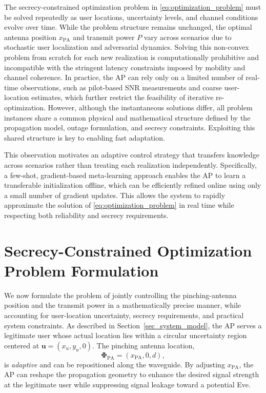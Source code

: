 \documentclass[journal,10pt]{IEEEtran}
\begin{document}
The secrecy-constrained optimization problem in \eqref{eq:optimization_problem} must be solved repeatedly as user locations, uncertainty levels, and channel conditions evolve over time. While the problem structure remains unchanged, the optimal antenna position $x_{\mathrm{PA}}$ and transmit power $P$ vary across scenarios due to stochastic user localization and adversarial dynamics. Solving this non-convex problem from scratch for each new realization is computationally prohibitive and incompatible with the stringent latency constraints imposed by mobility and channel coherence. In practice, the AP can rely only on a limited number of real-time observations, such as pilot-based SNR measurements and coarse user-location estimates, which further restrict the feasibility of iterative re-optimization. However, although the instantaneous solutions differ, all problem instances share a common physical and mathematical structure defined by the propagation model, outage formulation, and secrecy constraints. Exploiting this shared structure is key to enabling fast adaptation.

This observation motivates an adaptive control strategy that transfers knowledge across scenarios rather than treating each realization independently. Specifically, a few-shot, gradient-based meta-learning approach enables the AP to learn a transferable initialization offline, which can be efficiently refined online using only a small number of gradient updates. This allows the system to rapidly approximate the solution of \eqref{eq:optimization_problem} in real time while respecting both reliability and secrecy requirements.


\section{Secrecy-Constrained Optimization Problem Formulation}\label{sec_security_constraints} 
We now formulate the problem of jointly controlling the pinching-antenna position and the transmit power in a mathematically precise manner, while accounting for user-location uncertainty, secrecy requirements, and practical system constraints. As described in Section~\ref{sec_system_model}, the AP serves a legitimate user whose actual location lies within a circular uncertainty region centered at $\mathbf{u} = (x_u, y_u, 0)$. The pinching antenna location,
\begin{equation}
\boldsymbol{\Phi}_{\mathrm{PA}} = (x_{\mathrm{PA}}, 0, d),
\end{equation}
is \emph{adaptive} and can be repositioned along the waveguide. By adjusting $x_{\mathrm{PA}}$, the AP can reshape the propagation geometry to enhance the desired signal strength at the legitimate user while suppressing signal leakage toward a potential Eve.
\end{document}
